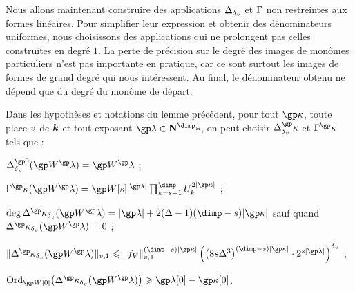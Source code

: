 Nous allons maintenant construire des applications \( \Delta_{\delta\smash{_v}} \) et \(
  \Gamma \) non restreintes aux formes linéaires. Pour simplifier leur
expression et obtenir des dénominateurs uniformes, nous choisissons des
applications qui ne prolongent pas celles construites en degré \( 1 \). La
perte de précision sur le degré des images de monômes particuliers n'est pas
importante en pratique, car ce sont surtout les images de formes de grand
degré qui nous intéressent. Au final, le dénominateur obtenu ne dépend que du
degré du monôme de départ.

\begin{lem} \label{l:par-anyvar-mono}
  Dans les hypothèses et notations du lemme précédent, pour tout \( \derp \),
  toute place \( v \) de \( {\boldsymbol k} \) et tout exposant \( \ip \in \N^\dimp*
  \), on peut choisir \( \pmnum_\dv^\derp \) et \( \pmden^\derp \) tels que :
  \begin{enumthm}
    \item \( \pmnum_\dv^{\gp 0}( \anyvp^\ip ) = \anyvp^\ip \) ;
    \item \( \pmden^\derp( \anyvp^\ip )
        =
        \anyvp[\anydim]^{\lgr\ip}
        \prod_{\ind = \anydim + 1}^{\dimp} \pden_\ind^{2\lgr\derp}
      \) ;
    \item \( \deg \pmnum^\derp_\dv (\anyvp^\ip)
        = \lgr\ip + 2 (\anydeg - 1) (\dimp - \anydim) \lgr\derp \) sauf quand
      \( \pmnum^\derp_\dv (\anyvp^\ip) = 0 \) ;
    \item \(
        \nv1{ \pmnum^\derp_\dv (\anyvp^\ip) }
        \le
        \nv1{ \chow\anyvar }^{(\dimp - \anydim) \lgr\derp}
        \left(
          \bigl( 8 \anydim \anydeg^{3} \bigr)^{(\dimp - \anydim) \lgr\derp}
          \cdot 2^{ \anydim \lgr\ip }
        \right)^\dv
      \) ;
    \item \( \ord_{\anyvp[0]} \bigl( \pmnum^\derp_\dv (\anyvp^\ip) \bigr)
        \ge \ip[0] - \derp[0] \).
  \end{enumthm}
\end{lem}

